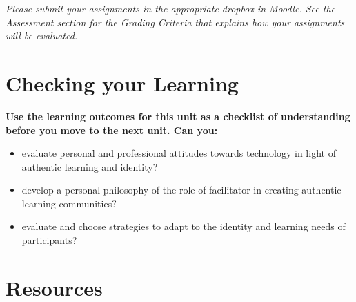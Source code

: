 \documentclass[
]{book}
\providecommand{\tightlist}{%
  \setlength{\itemsep}{0pt}\setlength{\parskip}{0pt}}
\begin{document}
\begin{caution}
\emph{Please submit your assignments in the appropriate dropbox in Moodle. See the Assessment section for the Grading Criteria that explains how your assignments will be evaluated.}
\end{caution}

\hypertarget{checking-your-learning-5}{%
\section*{Checking your Learning}\label{checking-your-learning-5}}

\begin{progress}
\textbf{Use the learning outcomes for this unit as a checklist of understanding
before you move to the next unit. Can you:}

\begin{itemize}
\tightlist
\item
  evaluate personal and professional attitudes towards technology in light of authentic learning and identity?\\
\item
  develop a personal philosophy of the role of facilitator in creating authentic learning communities?\\
\item
  evaluate and choose strategies to adapt to the identity and learning needs of participants?
\end{itemize}
\end{progress}

\hypertarget{resources}{%
\section*{Resources}\label{resources}}
\end{document}
